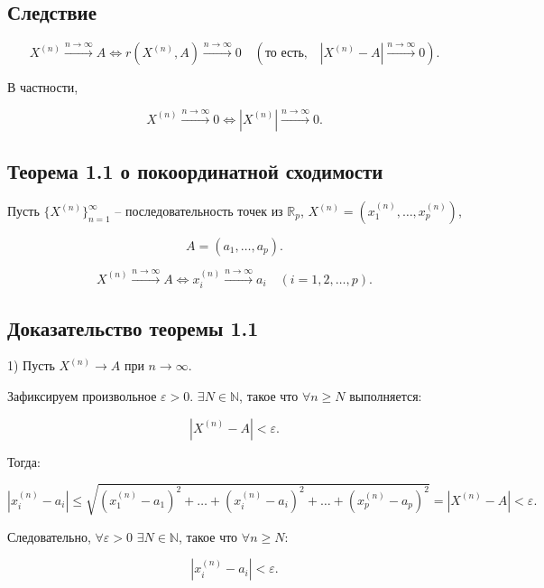 {\subsection*{Следствие}

\[
X^{(n)} \xrightarrow{n \to \infty} A \iff r(X^{(n)}, A) \xrightarrow{n \to \infty} 0 \quad (\text{то есть,} \quad |X^{(n)} - A| \xrightarrow{n \to \infty} 0).
\]

В частности,



\[
X^{(n)} \xrightarrow{n \to \infty} 0 \iff |X^{(n)}| \xrightarrow{n \to \infty} 0.
\]

\subsection*{Теорема 1.1 о покоординатной сходимости}

Пусть \( \{X^{(n)}\}_{n=1}^{\infty} \) – последовательность точек из \( \mathbb{R}_p \), \( X^{(n)} = (x_1^{(n)}, \ldots, x_p^{(n)}) \),



\[
A = (a_1, \ldots, a_p).
\]

\[
X^{(n)} \xrightarrow{n \to \infty} A \iff x_i^{(n)} \xrightarrow{n \to \infty} a_i \quad (i = 1, 2, \ldots, p).
\]


\subsection*{Доказательство теоремы 1.1}

1) Пусть \(X^{(n)} \to A\) при \(n \to \infty\).

Зафиксируем произвольное \( \varepsilon > 0 \). \( \exists N \in \mathbb{N} \), такое что \( \forall n \geq N \) выполняется:



\[
|X^{(n)} - A| < \varepsilon.
\]



Тогда:



\[
|x_i^{(n)} - a_i| \leq \sqrt{(x_1^{(n)} - a_1)^2 + \ldots + (x_i^{(n)} - a_i)^2 + \ldots + (x_p^{(n)} - a_p)^2} = |X^{(n)} - A| < \varepsilon.
\]



Следовательно, \( \forall \varepsilon > 0 \) \( \exists N \in \mathbb{N} \), такое что \( \forall n \geq N \):



\[
|x_i^{(n)} - a_i| < \varepsilon.
\]



}
